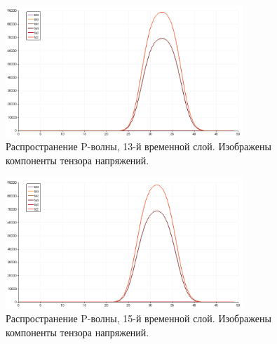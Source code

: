 \begin{figure}[htp]
\centering
\includegraphics[width=0.8\textwidth]{png/p-wave-test/s/0013.png}
\caption{Распространение P-волны, 13-й временной слой. Изображены компоненты тензора напряжений.}
\end{figure}

\begin{figure}[htp]
\centering
\includegraphics[width=0.8\textwidth]{png/p-wave-test/s/0015.png}
\caption{Распространение P-волны, 15-й временной слой. Изображены компоненты тензора напряжений.}
\label{pic:p_wave_15}
\end{figure}

\clearpage
\newpage

